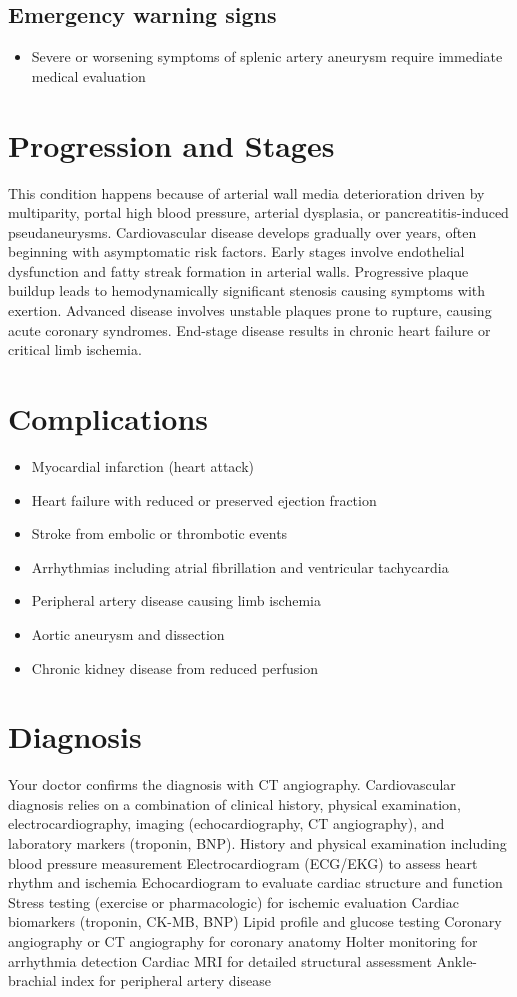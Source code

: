 \subsection{Emergency warning signs}
\begin{itemize}[noitemsep]
  \item Severe or worsening symptoms of splenic artery aneurysm require immediate medical evaluation
\end{itemize}
\section{Progression and Stages}
This condition happens because of arterial wall media deterioration driven by multiparity, portal high blood pressure, arterial dysplasia, or pancreatitis-induced pseudaneurysms. Cardiovascular disease develops gradually over years, often beginning with asymptomatic risk factors. Early stages involve endothelial dysfunction and fatty streak formation in arterial walls. Progressive plaque buildup leads to hemodynamically significant stenosis causing symptoms with exertion. Advanced disease involves unstable plaques prone to rupture, causing acute coronary syndromes. End-stage disease results in chronic heart failure or critical limb ischemia.
\section{Complications}
\begin{itemize}[noitemsep]
  \item Myocardial infarction (heart attack)
  \item Heart failure with reduced or preserved ejection fraction
  \item Stroke from embolic or thrombotic events
  \item Arrhythmias including atrial fibrillation and ventricular tachycardia
  \item Peripheral artery disease causing limb ischemia
  \item Aortic aneurysm and dissection
  \item Chronic kidney disease from reduced perfusion
\end{itemize}
\section{Diagnosis}
Your doctor confirms the diagnosis with CT angiography. Cardiovascular diagnosis relies on a combination of clinical history, physical examination, electrocardiography, imaging (echocardiography, CT angiography), and laboratory markers (troponin, BNP). History and physical examination including blood pressure measurement Electrocardiogram (ECG/EKG) to assess heart rhythm and ischemia Echocardiogram to evaluate cardiac structure and function Stress testing (exercise or pharmacologic) for ischemic evaluation Cardiac biomarkers (troponin, CK-MB, BNP) Lipid profile and glucose testing Coronary angiography or CT angiography for coronary anatomy Holter monitoring for arrhythmia detection Cardiac MRI for detailed structural assessment Ankle-brachial index for peripheral artery disease

